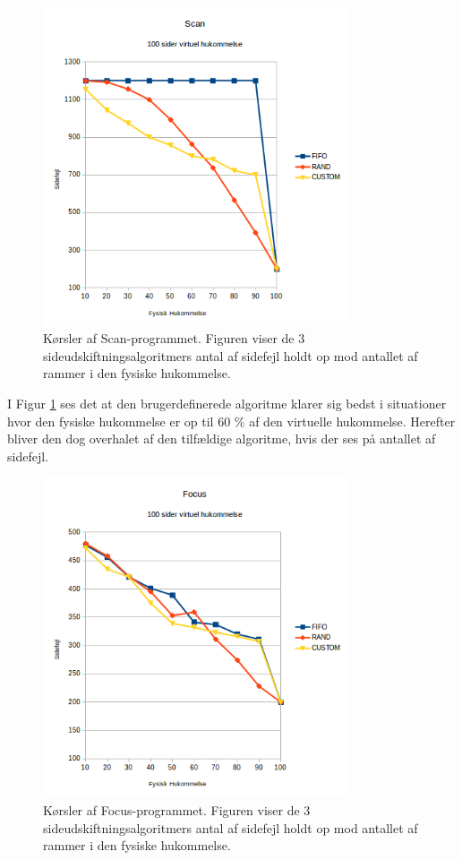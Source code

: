 \begin{figure}[h]
	\centering
	\includegraphics[width=0.8\textwidth]{figures/ScanStatistic.png}
	\caption{Kørsler af Scan-programmet. Figuren viser de 3 sideudskiftningsalgoritmers antal af sidefejl holdt op mod antallet af rammer i den fysiske hukommelse.}
	\label{fig:scanstatistic}
\end{figure}

I Figur \ref{fig:scanstatistic} ses det at den brugerdefinerede algoritme klarer sig bedst i situationer hvor den fysiske hukommelse er op til 60 \% af den virtuelle hukommelse. Herefter bliver den dog overhalet af den tilfældige algoritme, hvis der ses på antallet af sidefejl.\\

\begin{figure}[h]
	\centering
	\includegraphics[width=0.8\textwidth]{figures/FocusStatistic.png}
	\caption{Kørsler af Focus-programmet. Figuren viser de 3 sideudskiftningsalgoritmers antal af sidefejl holdt op mod antallet af rammer i den fysiske hukommelse.}
	\label{fig:focusstatistic}
\end{figure}

